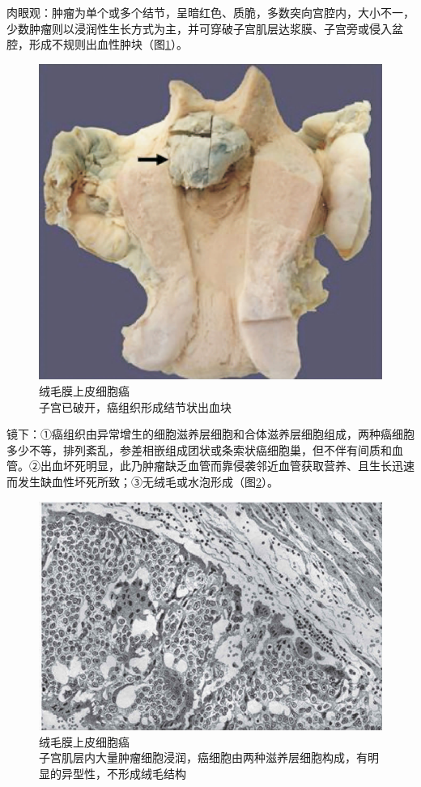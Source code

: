 肉眼观：肿瘤为单个或多个结节，呈暗红色、质脆，多数突向宫腔内，大小不一，少数肿瘤则以浸润性生长方式为主，并可穿破子宫肌层达浆膜、子宫旁或侵入盆腔，形成不规则出血性肿块（图\ref{fig11-8}）。

\begin{figure}[!htbp]
 \centering
 \includegraphics{./images/Image00193.jpg}
 \captionsetup{justification=centering}
 \caption{绒毛膜上皮细胞癌\\ {\small 子宫已破开，癌组织形成结节状出血块}}
\label{fig11-8}
  \end{figure}

镜下：①癌组织由异常增生的细胞滋养层细胞和合体滋养层细胞组成，两种癌细胞多少不等，排列紊乱，参差相嵌组成团状或条索状癌细胞巢，但不伴有间质和血管。②出血坏死明显，此乃肿瘤缺乏血管而靠侵袭邻近血管获取营养、且生长迅速而发生缺血性坏死所致；③无绒毛或水泡形成（图\ref{fig11-9}）。

\begin{figure}[!htbp]
 \centering
 \includegraphics{./images/Image00194.jpg}
 \captionsetup{justification=centering}
 \caption{绒毛膜上皮细胞癌\\ {\small 子宫肌层内大量肿瘤细胞浸润，癌细胞由两种滋养层细胞构成，有明显的异型性，不形成绒毛结构}}
\label{fig11-9}
  \end{figure}

